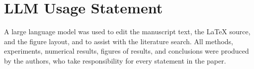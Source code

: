 \section*{LLM Usage Statement}
A large language model was used to edit the manuscript text, the LaTeX source, and the figure layout, and to assist with the literature search. All methods, experiments, numerical results, figures of results, and conclusions were produced by the authors, who take responsibility for every statement in the paper.
